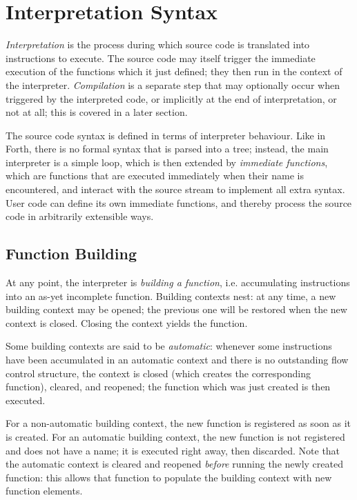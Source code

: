 \section{Interpretation Syntax}

\emph{Interpretation} is the process during which source code is
translated into instructions to execute. The source code may itself
trigger the immediate execution of the functions which it just defined;
they then run in the context of the interpreter. \emph{Compilation} is a
separate step that may optionally occur when triggered by the
interpreted code, or implicitly at the end of interpretation, or not at
all; this is covered in a later section.

The source code syntax is defined in terms of interpreter behaviour.
Like in Forth, there is no formal syntax that is parsed into a tree;
instead, the main interpreter is a simple loop, which is then extended
by \emph{immediate functions}, which are functions that are executed
immediately when their name is encountered, and interact with the source
stream to implement all extra syntax. User code can define its own
immediate functions, and thereby process the source code in arbitrarily
extensible ways.

\subsection{Function Building}

At any point, the interpreter is \emph{building a function}, i.e.
accumulating instructions into an as-yet incomplete function. Building
contexts nest: at any time, a new building context may be opened; the
previous one will be restored when the new context is closed. Closing
the context yields the function.

Some building contexts are said to be \emph{automatic}: whenever some
instructions have been accumulated in an automatic context and there is
no outstanding flow control structure, the context is closed (which
creates the corresponding function), cleared, and reopened; the function
which was just created is then executed.

For a non-automatic building context, the new function is registered as
soon as it is created. For an automatic building context, the new
function is not registered and does not have a name; it is executed
right away, then discarded. Note that the automatic context is cleared
and reopened \emph{before} running the newly created function: this
allows that function to populate the building context with new function
elements.


